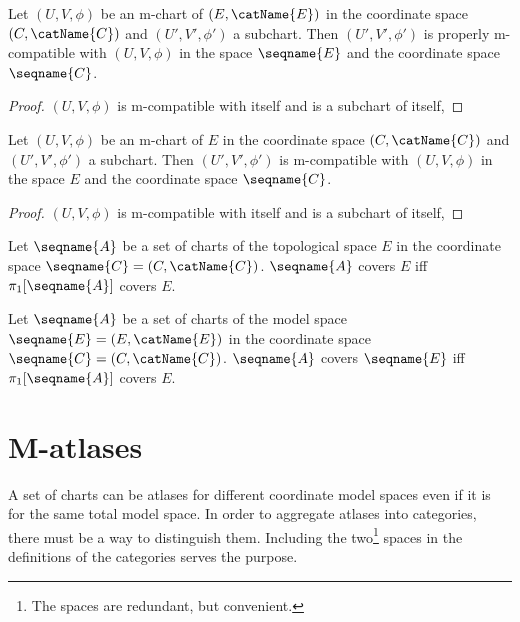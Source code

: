 \documentclass{article}
\begin{document}
\begin{corollary}
\label{cor:M-compatsub}
Let $(U, V, \phi)$ be an m-chart of $(E, \catName{E})$ in
the coordinate space $(C,\catName{C})$ and $(U', V', \phi')$ a
subchart. Then $(U', V', \phi')$ is properly m-compatible with
\nobreaks
  {{
    $(U, V, \phi)$
  }}
in the space $\seqname{E}$ and the coordinate space $\seqname{C}$.

\begin{proof}
$(U, V, \phi)$ is m-compatible with itself and is a subchart of
itself,
\end{proof}

Let $(U, V, \phi)$ be an m-chart of $E$ in the coordinate
space $(C,\catName{C})$ and $(U', V', \phi')$ a subchart. Then
$(U', V', \phi')$ is m-compatible with
\nobreaks
  {{
    $(U,V,\phi)$
  }}
in the space $E$ and the coordinate space $\seqname{C}$.

\begin{proof}
$(U, V, \phi)$ is m-compatible with itself and is a subchart of
itself,
\end{proof}
\end{corollary}

\begin{definition}
Let $\seqname{A}$ be a set of charts of the topological space $E$ in
the coordinate space
$\seqname{C}=(C,\catName{C})$.
$\seqname{A}$ covers $E$ iff $\pi_1[\seqname{A}]$ covers $E$.

Let $\seqname{A}$ be a set of charts of the model space
$\seqname{E}=(E, \catName{E})$ in the coordinate space
$\seqname{C}=(C,\catName{C})$.  $\seqname{A}$ covers $\seqname{E}$ iff
$\pi_1[\seqname{A}]$ covers $E$.
\end{definition}

\section{M-atlases}
\label{sec:M-atlas}
A set of charts can be atlases for different coordinate model spaces
even if it is for the same total model space. In order to aggregate
atlases into categories, there must be a way to distinguish them.
Including the two\footnote{
The spaces are redundant, but convenient.}
spaces in the definitions of the categories serves the purpose.
\end{document}

